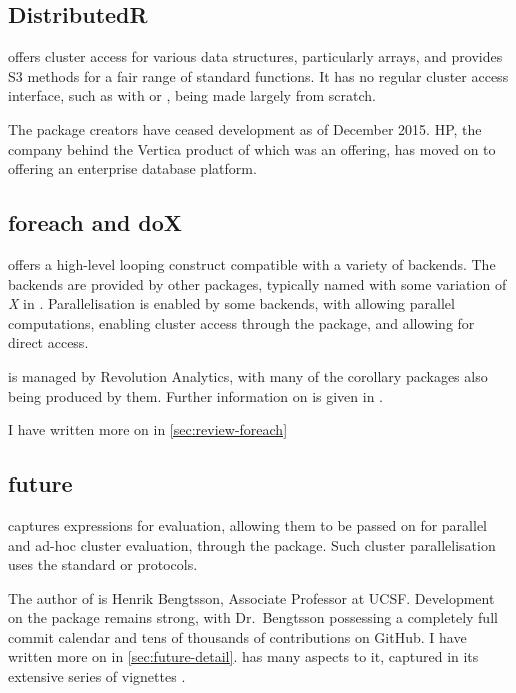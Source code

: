 \subsection{DistributedR}\label{subsec:distributedr}

 offers cluster access for various \R{} data structures,
particularly arrays, and provides S3 methods for a fair range of
standard functions.
It has no regular cluster access interface, such as with  or , being made largely from scratch.

The package creators have ceased development as of December 2015.
HP, the company behind the Vertica product of which  was an offering, has moved on to offering an enterprise database platform\cite{vertica:_distr}.

\subsection{foreach and doX}\label{subsec:foreach-doc}

 offers a high-level looping construct compatible with a variety
of backends\cite{microsoft20}.
The backends are provided by other packages, typically named with some variation of \emph{X} in .
Parallelisation is enabled by some backends, with  allowing parallel computations\cite{corporation19},  enabling cluster access through the  package\cite{dosnow19}, and  allowing for direct  access\cite{weston17}.

 is managed by Revolution Analytics, with many of the 
corollary packages also being produced by them.
Further information on  is given in \cite{weston19:_using}.

I have written more on  in \cref{sec:review-foreach}

\subsection{future}\label{subsec:future-furrr}

 captures \R{} expressions for evaluation, allowing them to be passed on for parallel and ad-hoc cluster evaluation, through the  package\cite{bengtsson20}.
Such cluster parallelisation uses the standard  or  protocols.

The author of  is Henrik Bengtsson, Associate Professor at UCSF.
Development on the package remains strong, with Dr.~Bengtsson possessing a completely full commit calendar and tens of thousands of contributions on GitHub.
I have written more on  in \cref{sec:future-detail}.
 has many aspects to it, captured in its
extensive series of vignettes\cites{bengtsson20:future-r,bengtsson20:future-r2}
\cites{bengtsson20:future-r3,bengtsson20:future-r4,bengtsson20:future-r5,bengtsson20:future-r6}.


